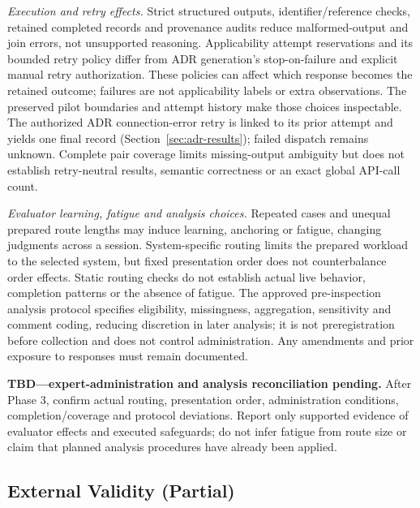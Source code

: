 \emph{Execution and retry effects.}
Strict structured outputs, identifier/reference checks, retained completed
records and provenance audits reduce malformed-output and join errors,
not unsupported reasoning. Applicability attempt reservations and its
bounded retry policy differ from ADR generation's stop-on-failure and
explicit manual retry authorization. These policies can affect which
response becomes the retained outcome; failures are not applicability
labels or extra observations. The preserved pilot boundaries and attempt
history make those choices inspectable. The authorized ADR connection-error
retry is linked to its prior attempt and yields one final record
(Section~\ref{sec:adr-results}); failed dispatch remains unknown.
Complete pair coverage limits missing-output ambiguity but does not
establish retry-neutral results, semantic correctness or an exact global
API-call count.

\emph{Evaluator learning, fatigue and analysis choices.}
Repeated cases and unequal prepared route lengths may induce learning,
anchoring or fatigue, changing judgments across a session.
System-specific routing limits the prepared workload to the selected
system, but fixed presentation order does not counterbalance order effects.
Static routing checks do not establish actual live behavior, completion
patterns or the absence of fatigue. The approved pre-inspection analysis
protocol specifies eligibility, missingness, aggregation, sensitivity
and comment coding, reducing discretion in later analysis; it is not
preregistration before collection and does not control administration.
Any amendments and prior exposure to responses must remain documented.

\noindent\textbf{TBD---expert-administration and analysis reconciliation
pending.} After Phase 3, confirm actual routing, presentation order,
administration conditions, completion/coverage and protocol deviations.
Report only supported evidence of evaluator effects and executed
safeguards; do not infer fatigue from route size or claim that planned
analysis procedures have already been applied.

\subsection{External Validity (Partial)}
\label{sec:external-validity}

